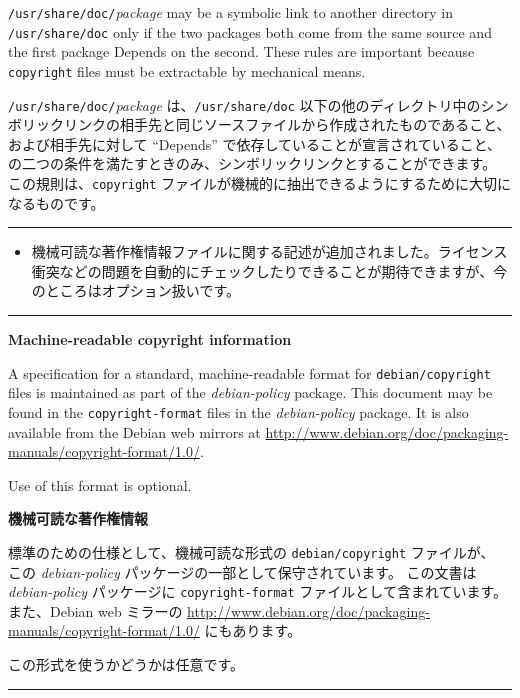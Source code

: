\documentclass[mingoth,a4paper]{jsarticle}
\begin{document}
\par
\parbox{0.48\linewidth}{
	  {\tt /usr/share/doc/}{\it package} may be a symbolic
	  link to another directory in {\tt /usr/share/doc} only if
	  the two packages both come from the same source and the
	  first package Depends on the second.  These rules are important
	  because {\tt copyright} files must be extractable by
	  mechanical means.
}\hfil 
\parbox{0.48\linewidth}{
	  {\tt/usr/share/doc/}{\it package}
	  は、{\tt /usr/share/doc}
	  以下の他のディレクトリ中のシンボリックリンクの相手先と同じソースファイルから作成されたものであること、および相手先に対して
	  ``Depends'' で依存していることが宣言されていること、の二つの条件を満たすときのみ、シンボリックリンクとすることができます。
	  この規則は、{\tt copyright} ファイルが機械的に抽出できるようにするために大切になるものです。
}
\hrule
\vspace{1ex}

\begin{itemize}
\item 機械可読な著作権情報ファイルに関する記述が追加されました。ライセンス衝突などの問題を自動的にチェックしたりできることが期待できますが、今のところはオプション扱いです。
\end{itemize}

\vspace{1ex}
\hrule
{}\par
\parbox{0.48\linewidth}{
	  {\bf Machine-readable copyright information}

	    A specification for a standard, machine-readable format
	    for {\tt debian/copyright} files is maintained as part
	    of the {\it debian-policy} package.  This
	    document may be found in the {\tt copyright-format}
	    files in the {\it debian-policy} package.  It is
	    also available from the Debian web mirrors at
		     \url{http://www.debian.org/doc/packaging-manuals/copyright-format/1.0/}.

	    Use of this format is optional.
}\hfil 
\parbox{0.48\linewidth}{
	  {\bf 機械可読な著作権情報}

	    標準のための仕様として、機械可読な形式の
	    {\tt debian/copyright} ファイルが、
	    この {\it debian-policy} パッケージの一部として保守されています。
	    この文書は {\it debian-policy} パッケージに
	    {\tt copyright-format} ファイルとして含まれています。
	    また、Debian web ミラーの
		     \url{http://www.debian.org/doc/packaging-manuals/copyright-format/1.0/} にもあります。

	    この形式を使うかどうかは任意です。
}
\hrule
\vspace{1ex}
\end{document}
